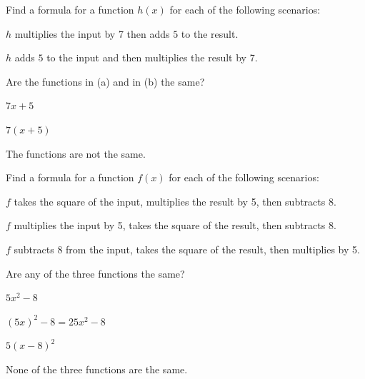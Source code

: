 \begin{exercise}
Find a formula for a function $h(x)$ for each of the following scenarios:


\begin{parts}
\item $h$ multiplies the input by 7 then adds $5$ to the result.

\item $h$ adds $5$ to the input and then multiplies the result by 7.
\end{parts}

\noindent Are the functions in (a) and in (b) the same?
\end{exercise}


\begin{solution}

\begin{parts}
\item $7x+5$
\item $7(x+5)$
\end{parts}
\noindent The functions are not the same.
\end{solution}






\begin{exercise}
Find a formula for a function $f(x)$ for each of the following scenarios:


\begin{parts}
\item $f$ takes the square of the input, multiplies the result by 5, then subtracts 8.

\item $f$ multiplies the input by 5, takes the square of the result, then subtracts 8.

\item  $f$ subtracts 8 from the input, takes the square of the result, then multiplies by 5.
\end{parts}

\noindent Are any of the three functions the same?
\end{exercise}


\begin{solution}

\begin{parts}
\item $5x^2-8$
\item $(5x)^2-8 = 25x^2-8$
\item $5(x-8)^2$
\end{parts}
\noindent None of the three functions are the same.
\end{solution}










